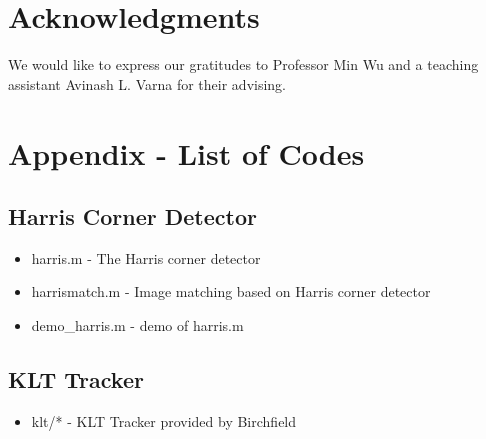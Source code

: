 \documentclass{article}
\begin{document}
\section{Acknowledgments}

We would like to express our gratitudes to Professor Min Wu and a teaching assistant Avinash L. Varna for their advising. 

\section{Appendix - List of Codes}

\subsection{Harris Corner Detector}
\begin{itemize}
\item harris.m - The Harris corner detector
\item harrismatch.m - Image matching based on Harris corner detector
\item demo\_harris.m - demo of harris.m
\end{itemize}

\subsection{KLT Tracker}
\begin{itemize}
\item klt/* - KLT Tracker provided by Birchfield \cite{bStan07}
\end{itemize}
\end{document}
